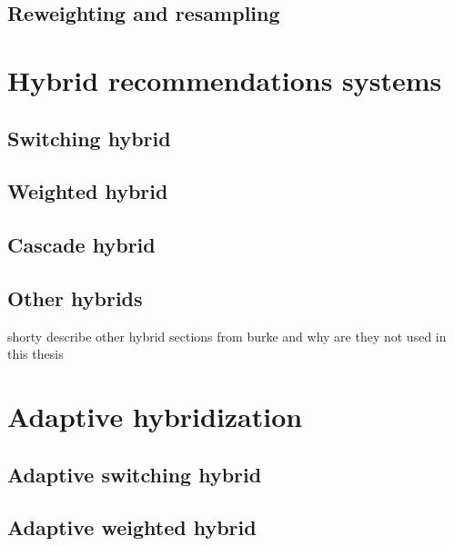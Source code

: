 \documentclass[10pt]{reportMaster}
\begin{document}
\section{Reweighting and resampling}



\chapter{Hybrid recommendations systems}

\section{Switching hybrid}

\section{Weighted hybrid}

\section{Cascade hybrid}

\section{Other hybrids}
shorty describe other hybrid sections from burke and why are they not used in this thesis







\chapter{Adaptive hybridization}

\section{Adaptive switching hybrid}


\section{Adaptive weighted hybrid}
\end{document}

